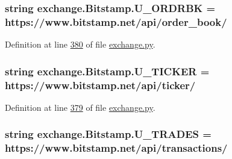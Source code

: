 \subsubsection[{\texorpdfstring{U\+\_\+\+O\+R\+D\+R\+BK}{U_ORDRBK}}]{\setlength{\rightskip}{0pt plus 5cm}string exchange.\+Bitstamp.\+U\+\_\+\+O\+R\+D\+R\+BK = \textquotesingle{}https\+://www.\+bitstamp.\+net/api/order\+\_\+book/\textquotesingle{}\hspace{0.3cm}{\ttfamily [static]}}\hypertarget{classexchange_1_1_bitstamp_ab83fdca31947f7b1a9ff6713945baec0}{}\label{classexchange_1_1_bitstamp_ab83fdca31947f7b1a9ff6713945baec0}


Definition at line \hyperlink{exchange_8py_source_l00380}{380} of file \hyperlink{exchange_8py_source}{exchange.\+py}.

\subsubsection[{\texorpdfstring{U\+\_\+\+T\+I\+C\+K\+ER}{U_TICKER}}]{\setlength{\rightskip}{0pt plus 5cm}string exchange.\+Bitstamp.\+U\+\_\+\+T\+I\+C\+K\+ER = \textquotesingle{}https\+://www.\+bitstamp.\+net/api/{\bf ticker}/\textquotesingle{}\hspace{0.3cm}{\ttfamily [static]}}\hypertarget{classexchange_1_1_bitstamp_ad8453cd76be07bef0001b642e110f981}{}\label{classexchange_1_1_bitstamp_ad8453cd76be07bef0001b642e110f981}


Definition at line \hyperlink{exchange_8py_source_l00379}{379} of file \hyperlink{exchange_8py_source}{exchange.\+py}.

\subsubsection[{\texorpdfstring{U\+\_\+\+T\+R\+A\+D\+ES}{U_TRADES}}]{\setlength{\rightskip}{0pt plus 5cm}string exchange.\+Bitstamp.\+U\+\_\+\+T\+R\+A\+D\+ES = \textquotesingle{}https\+://www.\+bitstamp.\+net/api/transactions/\textquotesingle{}\hspace{0.3cm}{\ttfamily [static]}}\hypertarget{classexchange_1_1_bitstamp_a2424678b2c64d540ce9ecd0af2f96991}{}\label{classexchange_1_1_bitstamp_a2424678b2c64d540ce9ecd0af2f96991}


